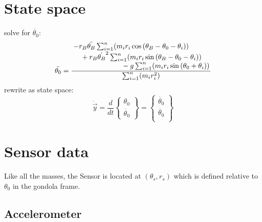 \documentclass[titlepage]{article}
\numberwithin{equation}{section}
\begin{document}
\pagebreak
\section{State space}
solve for $\ddot{\theta_0}$:
\begin{equation}
\ddot{\theta_0} =
    \frac{
        \splitfrac{
            \splitfrac{
                - r_B \ddot{\theta_B} \sum_{i=1}^{n}(m_i r_i \cos{(\theta_B - \theta_0 - \theta_i)})
            } {
                + r_B \dot{\theta_B}^2 \sum_{i=1}^{n}(m_i r_i \sin{(\theta_B - \theta_0 - \theta_i)})
            }
        } {
            - g \sum_{i=1}^{n}(m_i r_i \sin{(\theta_0 + \theta_i)})
        }
    } {
        \sum_{i=1}^{n}(m_i r_i^2)
    } \label{eq:thetadd}
\end{equation}
rewrite as state space:
\begin{equation}
\dot{\overrightarrow{y}} = \frac{d}{dt}
\left\{\!
\begin{array}{c}
  \theta_0 \\
  \dot{\theta_0}
\end{array}
\!\right\} = 
\left\{\!
\begin{array}{c}
  \dot{\theta_0} \\
  \ddot{\theta_0} \\
\end{array}
\!\right\}
\end{equation}

\section{Sensor data}
Like all the masses, the Sensor is located at $(\theta_s, r_s)$ which is defined relative to $\theta_0$ in the gondola frame.

\subsection{Accelerometer}
\end{document}
